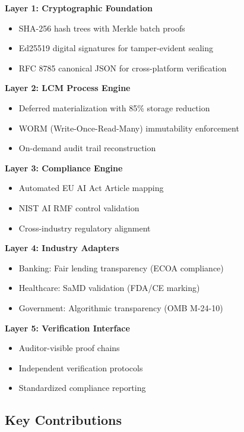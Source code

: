 \documentclass[12pt,a4paper]{article}
\begin{document}
\begin{technicalbox}
\textbf{Layer 1: Cryptographic Foundation}
\begin{itemize}
\item SHA-256 hash trees with Merkle batch proofs
\item Ed25519 digital signatures for tamper-evident sealing
\item RFC 8785 canonical JSON for cross-platform verification
\end{itemize}

\textbf{Layer 2: LCM Process Engine}
\begin{itemize}
\item Deferred materialization with 85\% storage reduction
\item WORM (Write-Once-Read-Many) immutability enforcement
\item On-demand audit trail reconstruction
\end{itemize}

\textbf{Layer 3: Compliance Engine}
\begin{itemize}
\item Automated EU AI Act Article mapping
\item NIST AI RMF control validation
\item Cross-industry regulatory alignment
\end{itemize}

\textbf{Layer 4: Industry Adapters}
\begin{itemize}
\item Banking: Fair lending transparency (ECOA compliance)
\item Healthcare: SaMD validation (FDA/CE marking)
\item Government: Algorithmic transparency (OMB M-24-10)
\end{itemize}

\textbf{Layer 5: Verification Interface}
\begin{itemize}
\item Auditor-visible proof chains
\item Independent verification protocols
\item Standardized compliance reporting
\end{itemize}
\end{technicalbox}

\subsection{Key Contributions}
\end{document}
